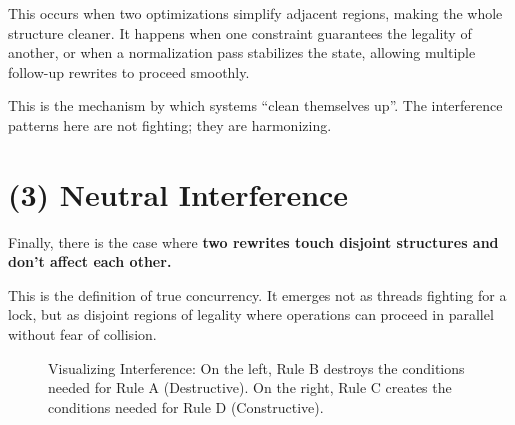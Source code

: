 This occurs when two optimizations simplify adjacent regions, making the whole structure cleaner. It happens when one constraint guarantees the legality of another, or when a normalization pass stabilizes the state, allowing multiple follow-up rewrites to proceed smoothly.

This is the mechanism by which systems ``clean themselves up''. The interference patterns here are not fighting; they are harmonizing.

\section{\texorpdfstring{\textbf{(3) Neutral Interference}}{12.6 --- (3) Neutral Interference}}

Finally, there is the case where \textbf{two rewrites touch disjoint structures and don't affect each other.}

This is the definition of true concurrency. It emerges not as threads fighting for a lock, but as disjoint regions of legality where operations can proceed in parallel without fear of collision.

\begin{figure}[h]
\centering
{}
\caption{Visualizing Interference: On the left, Rule B destroys the conditions needed for Rule A (Destructive). On the right, Rule C creates the conditions needed for Rule D (Constructive).}
\end{figure}

